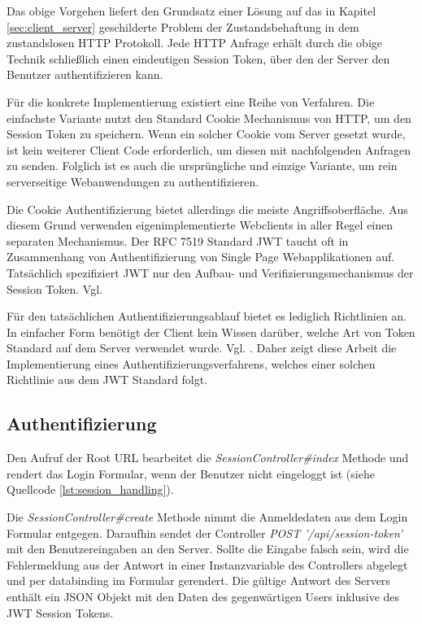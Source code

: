 Das obige Vorgehen liefert den Grundsatz einer Lösung auf das in Kapitel \ref{sec:client_server} geschilderte Problem der Zustandsbehaftung in dem zustandslosen HTTP Protokoll. Jede HTTP Anfrage erhält durch die obige Technik schließlich einen eindeutigen Session Token, über den der Server den Benutzer authentifizieren kann.

Für die konkrete Implementierung existiert eine Reihe von Verfahren. Die einfachste Variante nutzt den Standard Cookie Mechanismus von HTTP, um den Session Token zu speichern. Wenn ein solcher Cookie vom Server gesetzt wurde, ist kein weiterer Client Code erforderlich, um diesen mit nachfolgenden Anfragen zu senden. Folglich ist es auch die ursprüngliche und einzige Variante, um rein serverseitige Webanwendungen zu authentifizieren.

Die Cookie Authentifizierung bietet allerdings die meiste Angriffsoberfläche. Aus diesem Grund verwenden eigenimplementierte Webclients in aller Regel einen separaten Mechanismus. Der  RFC 7519 Standard JWT taucht oft in Zusammenhang von Authentifizierung von Single Page Webapplikationen auf. Tatsächlich spezifiziert JWT nur den Aufbau- und Verifizierungsmechanismus der Session Token. Vgl. \cite[Kap. 1]{Peyrott:2018}

Für den tatsächlichen Authentifizierungsablauf bietet es lediglich Richtlinien an. In einfacher Form benötigt der Client kein Wissen darüber, welche Art von Token Standard auf dem Server verwendet wurde. Vgl. \cite[Kap. 2.2]{Peyrott:2018}. Daher zeigt diese Arbeit die Implementierung eines Authentifizierungsverfahrens, welches einer solchen Richtlinie aus dem JWT Standard folgt.

\subsection{Authentifizierung}

Den Aufruf der Root URL bearbeitet die \emph{SessionController\#index} Methode und rendert das Login Formular, wenn der Benutzer nicht eingeloggt ist (siehe Quellcode \ref{lst:session_handling}).

Die \emph{SessionController\#create} Methode nimmt die Anmeldedaten aus dem Login Formular entgegen. Daraufhin sendet der Controller \emph{POST '/api/session-token'} mit den Benutzereingaben an den Server. Sollte die Eingabe falsch sein, wird die Fehlermeldung aus der Antwort in einer Instanzvariable des Controllers abgelegt und per \gls{databinding} im Formular gerendert. Die gültige Antwort des Servers enthält ein JSON Objekt mit den Daten des gegenwärtigen Users inklusive des JWT Session Tokens.

